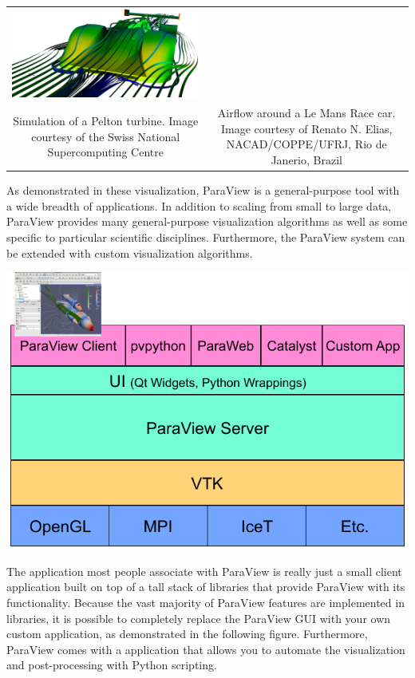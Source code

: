 \begin{inlinefig}
\begin{tabular}{cc}
    \includegraphics[width=.61\linewidth]{images/LeMansCar} \\
    \parbox[t]{.29\linewidth}{\footnotesize Simulation of a Pelton turbine.
      Image courtesy of the Swiss National Supercomputing Centre} &
    \parbox[t]{.61\linewidth}{\footnotesize Airflow around a Le Mans Race
      car.  Image courtesy of Renato N. Elias, NACAD/COPPE/UFRJ, Rio de
      Janerio, Brazil}
  \end{tabular}
\end{inlinefig}

As demonstrated in these visualization, ParaView is a general-purpose tool
with a wide breadth of applications.  In addition to scaling from small to
large data, ParaView provides many general-purpose visualization algorithms
as well as some specific to particular scientific disciplines.
Furthermore, the ParaView system can be extended with custom visualization
algorithms.

\begin{inlinefig}
  \includegraphics[scale=\bbscale]{images/ParaViewLibStack}
\end{inlinefig}

The application most people associate with ParaView is really just a small
client application built on top of a tall stack of libraries that provide
ParaView with its functionality.  Because the vast majority of ParaView
features are implemented in libraries, it is possible to completely replace
the ParaView GUI with your own custom application, as demonstrated in the
following figure.  Furthermore, ParaView comes with a 
application that allows you to automate the visualization and
post-processing with Python scripting.

